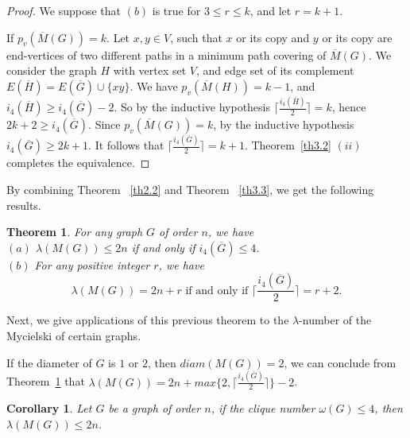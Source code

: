 \documentclass{article}
\newtheorem{theorem} {Theorem}
\newtheorem{cor} {Corollary}
\newtheorem{open problem} {Open Problem}
\numberwithin{lemma}{section}
\numberwithin{theorem}{section}
\numberwithin{cor}{section}
\numberwithin{prop}{section}
\numberwithin{con}{section}
\numberwithin{claim}{section}
\numberwithin{obs}{section}
\numberwithin{dnt}{section}
\begin{document}
\begin{proof}
	We suppose that $(b)$ is true for $3\leq r \leq k$, and let $r=k+1$. 
	\par If $p_v(\overline{M}(G))=k$. Let $x,y\in V$, such that $x$ or its copy and $y$ or its copy are end-vertices of two different paths in a minimum path covering of $\overline{M}(G)$.  We consider the graph $H$ with vertex set $V$, and edge set of its complement $E(\overline{H})=E(\overline{G})\cup\{xy\}$. We have $p_v(\overline{M}(H))= k-1$, and $i_4(\overline{H})\geq i_4(\overline{G})-2$. So by the inductive hypothesis $\lceil \frac{i_4(\overline{H})}{2} \rceil=k$, hence $2k+2 \geq i_4(\overline{G})$. Since $p_v(\overline{M}(G))=k$, by the inductive hypothesis $i_4(\overline{G})\geq 2k+1$. It follows that $\lceil \frac{i_4(\overline{G})}{2} \rceil=k+1$. Theorem~\ref{th3.2} $(ii)$ completes the equivalence. 	
\end{proof}
By combining Theorem ~\ref{th2.2} and Theorem ~\ref{th3.3}, we get the following results.
\begin{theorem}\label{th3.4}
	For any graph $G$ of order $n$, we have\\
	$(a)$ $\lambda(M(G))\leq 2n$ if and only if $i_4(\overline{G})\leq 4$.\\
	$(b)$ For any positive integer $r$, we have $$\lambda(M(G))= 2n+r \text{ if and only if }  \lceil \frac{i_4(\overline{G})}{2} \rceil=r+2.$$
\end{theorem}
\par  Next, we give applications of this previous theorem to the $\lambda$-number of the Mycielski of certain graphs.\par  
If the diameter of $G$ is $1$ or $2$, then $diam(M(G))=2$, we can conclude from Theorem~\ref{th3.4} that $\lambda(M(G))=2n+max\{2,\lceil \frac{i_4(\overline{G})}{2} \rceil \}-2$.
\begin{cor}\label{cor3.2}
	Let $G$ be a graph of order $n$, if the clique number $\omega(G)\leq 4 $, then $ \lambda(M (G))\leq 2n$.
\end{cor}
\end{document}
